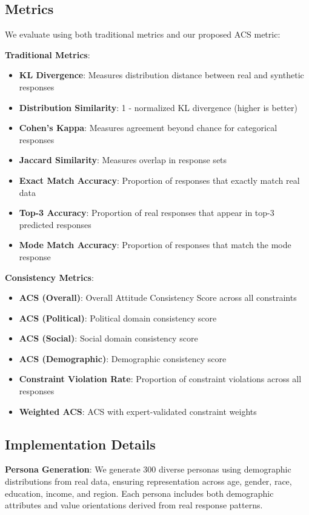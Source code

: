 \documentclass[sigconf, anonymous]{acmart}
\begin{document}
\subsection{Metrics}

We evaluate using both traditional metrics and our proposed ACS metric:

\textbf{Traditional Metrics}:
\begin{itemize}
    \item \textbf{KL Divergence}: Measures distribution distance between real and synthetic responses
    \item \textbf{Distribution Similarity}: 1 - normalized KL divergence (higher is better)
    \item \textbf{Cohen's Kappa}: Measures agreement beyond chance for categorical responses
    \item \textbf{Jaccard Similarity}: Measures overlap in response sets
    \item \textbf{Exact Match Accuracy}: Proportion of responses that exactly match real data
    \item \textbf{Top-3 Accuracy}: Proportion of real responses that appear in top-3 predicted responses
    \item \textbf{Mode Match Accuracy}: Proportion of responses that match the mode response
\end{itemize}

\textbf{Consistency Metrics}:
\begin{itemize}
    \item \textbf{ACS (Overall)}: Overall Attitude Consistency Score across all constraints
    \item \textbf{ACS (Political)}: Political domain consistency score
    \item \textbf{ACS (Social)}: Social domain consistency score
    \item \textbf{ACS (Demographic)}: Demographic consistency score
    \item \textbf{Constraint Violation Rate}: Proportion of constraint violations across all responses
    \item \textbf{Weighted ACS}: ACS with expert-validated constraint weights
\end{itemize}

\subsection{Implementation Details}

\textbf{Persona Generation}: We generate 300 diverse personas using demographic distributions from real data, ensuring representation across age, gender, race, education, income, and region. Each persona includes both demographic attributes and value orientations derived from real response patterns.
\end{document}
